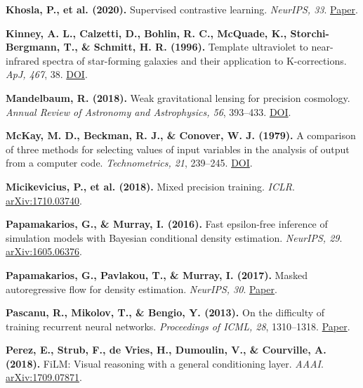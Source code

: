 \documentclass[11pt]{article}
\begin{document}
\hypertarget{ref:khosla2020}{}%
\textbf{Khosla, P., et al. (2020).} Supervised contrastive learning. \emph{NeurIPS, 33}. \href{https://proceedings.neurips.cc/paper/2020/hash/d89a66c7c80a29b1bdbab0f2a1a94af8-Abstract.html}{Paper}.\par
\hypertarget{ref:kinney1996}{}%
\textbf{Kinney, A. L., Calzetti, D., Bohlin, R. C., McQuade, K., Storchi-Bergmann, T., \& Schmitt, H. R. (1996).} Template ultraviolet to near-infrared spectra of star-forming galaxies and their application to K-corrections. \emph{ApJ, 467}, 38. \href{https://doi.org/10.1086/177583}{DOI}.\par
\hypertarget{ref:mandelbaum2018}{}%
\textbf{Mandelbaum, R. (2018).} Weak gravitational lensing for precision cosmology. \emph{Annual Review of Astronomy and Astrophysics, 56}, 393--433. \href{https://doi.org/10.1146/annurev-astro-081817-051928}{DOI}.\par
\hypertarget{ref:mckay1979}{}%
\textbf{McKay, M. D., Beckman, R. J., \& Conover, W. J. (1979).} A comparison of three methods for selecting values of input variables in the analysis of output from a computer code. \emph{Technometrics, 21}, 239--245. \href{https://doi.org/10.1080/00401706.1979.10489755}{DOI}.\par
\hypertarget{ref:micikevicius2018}{}%
\textbf{Micikevicius, P., et al. (2018).} Mixed precision training. \emph{ICLR}. \href{https://arxiv.org/abs/1710.03740}{arXiv:1710.03740}.\par
\hypertarget{ref:papamakarios2016}{}%
\textbf{Papamakarios, G., \& Murray, I. (2016).} Fast epsilon-free inference of simulation models with Bayesian conditional density estimation. \emph{NeurIPS, 29}. \href{https://arxiv.org/abs/1605.06376}{arXiv:1605.06376}.\par
\hypertarget{ref:papamakarios2017}{}%
\textbf{Papamakarios, G., Pavlakou, T., \& Murray, I. (2017).} Masked autoregressive flow for density estimation. \emph{NeurIPS, 30}. \href{https://papers.nips.cc/paper_files/paper/2017/hash/6c1da886822c67822bcf3679d04369fa-Abstract.html}{Paper}.\par
\hypertarget{ref:pascanu2013}{}%
\textbf{Pascanu, R., Mikolov, T., \& Bengio, Y. (2013).} On the difficulty of training recurrent neural networks. \emph{Proceedings of ICML, 28}, 1310--1318. \href{https://proceedings.mlr.press/v28/pascanu13.html}{Paper}.\par
\hypertarget{ref:perez2018}{}%
\textbf{Perez, E., Strub, F., de Vries, H., Dumoulin, V., \& Courville, A. (2018).} FiLM: Visual reasoning with a general conditioning layer. \emph{AAAI}. \href{https://arxiv.org/abs/1709.07871}{arXiv:1709.07871}.\par
\end{document}
